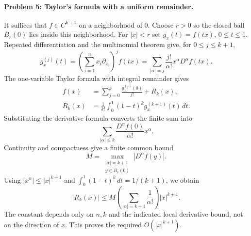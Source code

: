 \paragraph{Problem 5: Taylor's formula with a uniform remainder.}
\begin{expandedproof}
It suffices that $f\in C^{k+1}$ on a neighborhood of $0$. Choose $r>0$
so the closed ball $\overline B_r(0)$ lies inside this neighborhood. For
$|x|<r$ set $g_x(t)=f(tx)$, $0\leq t\leq1$. Repeated differentiation
and the multinomial theorem give, for $0\leq j\leq k+1$,
\[
 g_x^{(j)}(t)
 =\left(\sum_{i=1}^n x_i\partial_{x_i}\right)^j f(tx)
 =\sum_{|\alpha|=j}\frac{j!}{\alpha!}x^\alpha D^\alpha f(tx).
\]
The one-variable Taylor formula with integral remainder gives
\begin{align*}
 f(x)&=\sum_{j=0}^k\frac{g_x^{(j)}(0)}{j!}+R_k(x),\\
 R_k(x)&=\frac1{k!}\int_0^1(1-t)^k g_x^{(k+1)}(t)\,dt.
\end{align*}
Substituting the derivative formula converts the finite sum into
\[
 \sum_{|\alpha|\leq k}\frac{D^\alpha f(0)}{\alpha!}x^\alpha.
\]
Continuity and compactness give a finite common bound
\[
 M=\max_{\substack{|\alpha|=k+1\\y\in\overline B_r(0)}}
       |D^\alpha f(y)|.
\]
Using $|x^\alpha|\leq|x|^{k+1}$ and
$\int_0^1(1-t)^k\,dt=1/(k+1)$, we obtain
\[
 |R_k(x)|\leq M\left(\sum_{|\alpha|=k+1}\frac1{\alpha!}\right)
 |x|^{k+1}.
\]
The constant depends only on $n,k$ and the indicated local derivative bound,
not on the direction of $x$. This proves the required $O(|x|^{k+1})$.
\end{expandedproof}
\par\Needspace{65mm}
